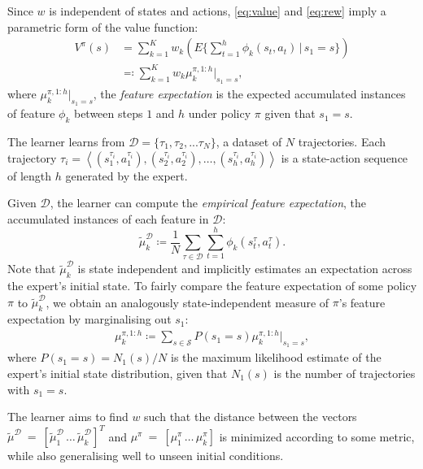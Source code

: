 \documentclass[letterpaper]{article}
\begin{document}
Since $w$ is independent of states and actions, \eqref{eq:value} and \eqref{eq:rew} imply a parametric form of the value function:
\begin{align}
 	V^{\pi}(s) &= \sum^K_{k=1}w_k\left(E\{\sum_{t = 1}^h\phi_k(s_t,a_t)\,\vert\, s_1 = s\}\right)\\
&\eqqcolon\sum^K_{k=1}w_k\mu^{\pi, 1:h}_k|_{s_1=s},\label{eq:parametrized_value}
\end{align}
where $\mu^{\pi,1:h}_k|_{s_1=s}$, the \emph{feature expectation} is the expected accumulated instances of feature $\phi_k$ between steps $1$ and $h$ under policy $\pi$  given that $s_1 = s$.

The learner learns from $\mathcal{D} = \big\{ \tau_1,\tau_2,...\tau_N \big\}$, a dataset of $N$ trajectories. Each trajectory $\tau_i = \left<(s^{\tau_i}_1,a^{\tau_i}_1),(s^{\tau_i}_2,a^{\tau_i}_2),\ldots,(s^{\tau_i}_{h},a^{\tau_i}_{h})\right>$ is a state-action sequence of length $h$ generated by the expert.

Given $\mathcal{D}$, the learner can compute the \emph{empirical feature expectation}, the accumulated instances of each feature in $\mathcal{D}$:
\begin{equation}
	\widetilde{\mu}^{\mathcal{D}}_k \coloneqq\frac{1}{N}\sum_{\tau\in\mathcal{D}}\sum_{t=1}^{h}\phi_k(s^\tau_t,a^\tau_t). \label{eqn:empirical_fe}
\end{equation}
Note that $\widetilde{\mu}^{\mathcal{D}}_k$ is state independent and implicitly estimates an expectation across
the expert's initial state.  To fairly compare the feature expectation of some policy $\pi$ to $\widetilde{\mu}^{\mathcal{D}}_k$, we obtain an analogously state-independent measure of $\pi$'s feature expectation by marginalising out $s_1$:
\begin{align}
  \label{eq:feature_expectation_belief}
  \mu^{\pi,1:h}_k \coloneqq \sum_{s\in\mathcal{S}}P(s_1 = s)\mu^{\pi,1:h}_k|_{s_1=s},
\end{align}
where $P(s_1 = s)= N_1(s)/N$ is the maximum likelihood estimate of the expert's initial state distribution, given that $N_1(s)$ is the number of trajectories with $s_1 = s$.

The learner aims to find $w$ such that the distance between the vectors $\widetilde\mu^{\mathcal{D}}~=~[\widetilde\mu^{\mathcal{D}}_1\,\ldots\,\widetilde\mu^{\mathcal{D}}_k]^T$ and $\mu^{\pi}~=~[\mu^{\pi}_1\,\ldots\,\mu^{\pi}_k]$ is minimized according to some metric, while also generalising well to unseen initial conditions.
\end{document}
